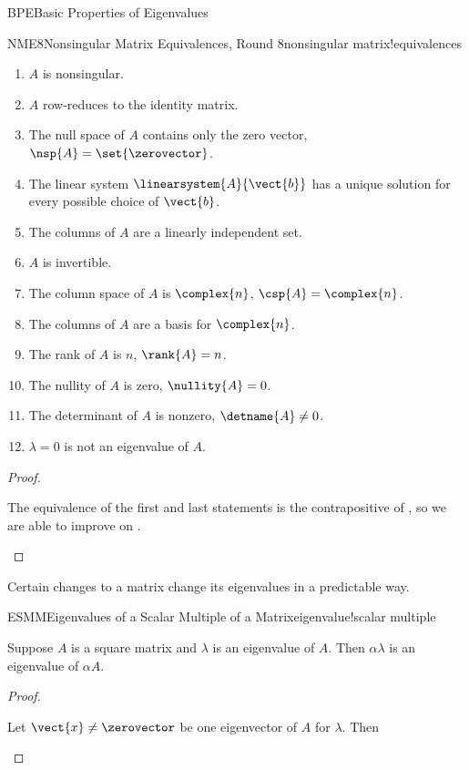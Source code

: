 \begin{subsect}{BPE}{Basic Properties of Eigenvalues}
\begin{theorem}{NME8}{Nonsingular Matrix Equivalences, Round 8}{nonsingular matrix!equivalences}
\begin{para}
%
\begin{enumerate}
\item $A$ is nonsingular.
\item $A$ row-reduces to the identity matrix.
\item The null space of $A$ contains only the zero vector, $\nsp{A}=\set{\zerovector}$.
\item The linear system $\linearsystem{A}{\vect{b}}$ has a unique solution for every possible choice of $\vect{b}$.
\item The columns of $A$ are a linearly independent set.
\item $A$ is invertible.
\item The column space of $A$ is $\complex{n}$, $\csp{A}=\complex{n}$.
\item The columns of $A$ are a basis for $\complex{n}$.
\item The rank of $A$ is $n$, $\rank{A}=n$.
\item The nullity of $A$ is zero, $\nullity{A}=0$.
\item The determinant of $A$ is nonzero, $\detname{A}\neq 0$.
\item $\lambda=0$ is not an eigenvalue of $A$.
\end{enumerate}
\end{para}
\end{theorem}
%
\begin{proof}
\begin{para}The equivalence of the first and last statements is the contrapositive of , so we are able to improve on .\end{para}
\end{proof}
%
%
\begin{para}Certain changes to a matrix change its eigenvalues in a predictable way.\end{para}
%
\begin{theorem}{ESMM}{Eigenvalues of a Scalar Multiple of a Matrix}{eigenvalue!scalar multiple}
\begin{para}Suppose $A$ is a square matrix and $\lambda$ is an eigenvalue of $A$.  Then $\alpha\lambda$ is an eigenvalue of $\alpha A$.\end{para}
\end{theorem}
%
\begin{proof}
%
\begin{para}Let $\vect{x}\neq\zerovector$ be one eigenvector of $A$ for $\lambda$.  Then

\end{para}
\end{proof}
\end{subsect}
